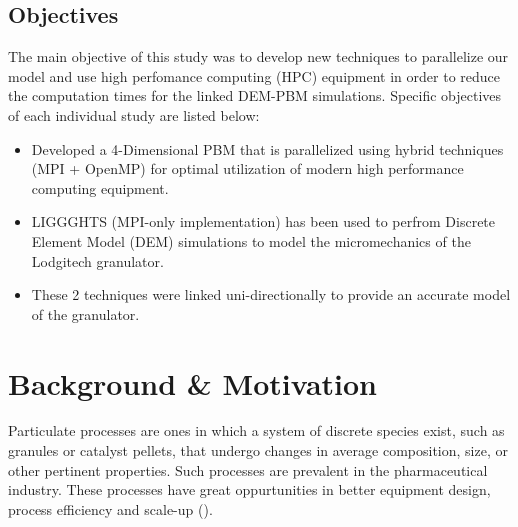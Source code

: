 \documentclass[preprint,11pt,authoryear]{elsarticle}
\begin{document}
\subsection{Objectives}
\par The main objective of this study was to develop new techniques to parallelize our model and use high perfomance computing (HPC) equipment in order to reduce the computation times for the linked DEM-PBM simulations. Specific objectives of each individual study are listed below: 
\begin{itemize}
\item Developed a 4-Dimensional PBM that is parallelized using hybrid techniques (MPI + OpenMP)  for optimal utilization of modern high performance computing equipment.
\item LIGGGHTS (MPI-only implementation) has been used to perfrom Discrete Element Model (DEM) simulations to  model the micromechanics of the Lodgitech granulator. 
\item These 2 techniques were linked uni-directionally to provide an accurate model of the granulator.	    
\end{itemize}



\section{Background \& Motivation}

\par Particulate processes are ones in which a system of discrete species exist, such as granules or catalyst pellets, that undergo changes in average composition, size, or other pertinent properties. Such processes are prevalent in the pharmaceutical industry. These processes have great oppurtunities in better equipment design, process efficiency and scale-up (\cite{Ketterhagen2009}). 

\end{document}
